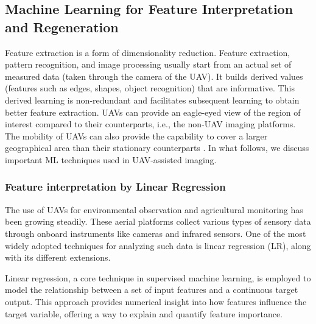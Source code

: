     
    

\subsection{Machine Learning for Feature Interpretation and Regeneration}


Feature extraction is a form of dimensionality reduction. Feature extraction, pattern recognition, and image processing usually start from an actual set of measured data (taken through the camera of the UAV). It builds derived values (features such as edges, shapes, object recognition) that are informative. This derived learning is non-redundant and facilitates subsequent learning to obtain better feature extraction. UAVs can provide an eagle-eyed view of the region of interest compared to their counterparts, i.e., the non-UAV imaging platforms. The mobility of UAVs can also provide the capability to cover a larger geographical area than their stationary counterparts \cite{244}. In what follows, we discuss important ML techniques used in UAV-assisted imaging.


\subsubsection{Feature interpretation by Linear Regression}



The use of UAVs for environmental observation and agricultural monitoring has been growing steadily. These aerial platforms collect various types of sensory data through onboard instruments like cameras and infrared sensors. One of the most widely adopted techniques for analyzing such data is linear regression (LR), along with its different extensions.

Linear regression, a core technique in supervised machine learning, is employed to model the relationship between a set of input features and a continuous target output. This approach provides numerical insight into how features influence the target variable, offering a way to explain and quantify feature importance.

